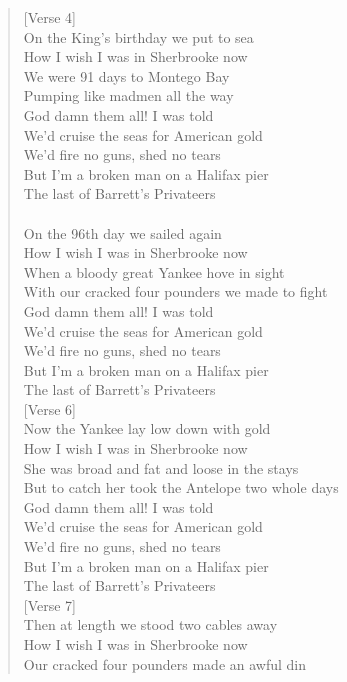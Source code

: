\documentclass[11pt]{article}
\begin{document}
\begin{verse}
[Verse 4]\\
On the King's birthday we put to sea\\
How I wish I was in Sherbrooke now\\
We were 91 days to Montego Bay\\
Pumping like madmen all the way\\
God damn them all! I was told\\
We'd cruise the seas for American gold\\
We'd fire no guns, shed no tears\\
But I'm a broken man on a Halifax pier\\
The last of Barrett's Privateers\\
[Verse 5]\\
On the 96th day we sailed again\\
How I wish I was in Sherbrooke now\\
When a bloody great Yankee hove in sight\\
With our cracked four pounders we made to fight\\
God damn them all! I was told\\
We'd cruise the seas for American gold\\
We'd fire no guns, shed no tears\\
But I'm a broken man on a Halifax pier\\
The last of Barrett's Privateers\\
\vspace*{1em}
[Verse 6]\\
Now the Yankee lay low down with gold\\
How I wish I was in Sherbrooke now\\
She was broad and fat and loose in the stays\\
But to catch her took the Antelope two whole days\\
God damn them all! I was told\\
We'd cruise the seas for American gold\\
We'd fire no guns, shed no tears\\
But I'm a broken man on a Halifax pier\\
The last of Barrett's Privateers\\
\vspace*{1em}
[Verse 7]\\
Then at length we stood two cables away\\
How I wish I was in Sherbrooke now\\
Our cracked four pounders made an awful din\\

\end{verse}
\end{document}
